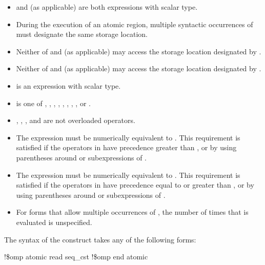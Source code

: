 \begin{itemize}
\item {} and  (as applicable) are both  expressions with scalar type.

\item During the execution of an atomic region, multiple syntactic occurrences of  must 
designate the same storage location.

\item Neither of  and  (as applicable) may access the storage location designated by .

\item Neither of  and  (as applicable) may access the storage location designated by .

\item {} is an expression with scalar type. 

\item {} is one of \code{+}, \code{*}, \code{-}, \code{/}, 
\code{\&}, \code{\^}, \code{|}, \code{\textless \hspace{0.05em}\textless}, or 
\code{\textgreater \hspace{0.05em}\textgreater}.

\item {}, \code{=}, \code{++}, and \code{\--\--} are not overloaded operators.

\item The expression    must be numerically equivalent to 
  . This 
requirement is satisfied if the operators in  have precedence greater than , 
or by using parentheses around  or subexpressions of .

\item The expression    must be numerically equivalent to 
  . This 
requirement is satisfied if the operators in  have precedence equal to or greater 
than , or by using parentheses around  or subexpressions of .

\item For forms that allow multiple occurrences of , the number of times that  is 
evaluated is unspecified.
\end{itemize}
\ccppspecificend

\begin{samepage}
\fortranspecificstart
The syntax of the  construct takes any of the following forms: 

\begin{boxedcode}
!\$omp atomic read \plc{[}seq\_cst\plc{]}
\plc{[}!\$omp end atomic\plc{]}
\end{boxedcode}
\end{samepage}

